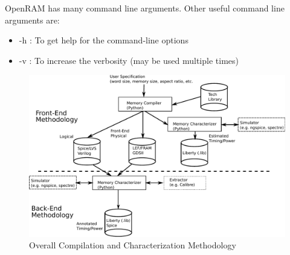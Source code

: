 OpenRAM has many command line arguments. Other useful command line arguments are:
\begin{itemize}
\item -h : To get help for the command-line options
\item -v : To increase the verbosity (may be used multiple times)
\end{itemize}

\begin{figure}[tb]
\centering
\includegraphics[width=14cm]{./figs/methodology.pdf}
\caption{Overall Compilation and Characterization Methodology
\label{fig:methodology}}
\end{figure}







